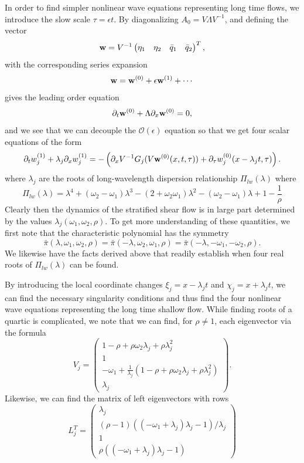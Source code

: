 \documentclass[a4paper,11pt]{article}
\newcommand{\bp}{\begin{pmatrix}}
\newcommand{\ep}{\end{pmatrix}}
\newcommand{\p}{\partial}
\begin{document}
In order to find simpler nonlinear wave equations representing long time flows, we introduce the slow scale $\tau = \epsilon t$.  By diagonalizing $A_{0} = V\Lambda V^{-1}$, and defining the vector 
\[
{\bf w} = V^{-1} \bp \eta_{1} & \eta_{2} & \bar{q}_{1} & \bar{q}_{2} \ep ^{T}, 
\] 
with the corresponding series expansion 
\[
{\bf w} = {\bf w}^{(0)} + \epsilon {\bf w}^{(1)} + \cdots 
\]
gives the leading order equation 
\[
\p_{t}{\bf w}^{(0)} +\Lambda \p_{x}{\bf w}^{(0)}  = 0,
\]
and we see that we can decouple the $\mathcal{O}(\epsilon)$ equation so that we get four scalar equations of the form 
\[
\p_{t} w^{(1)}_{j} + \lambda_{j}\p_{x}w^{(1)}_{j} =-\left( \p_{x}V^{-1}G_{j}(V{\bf w}^{(0)}(x,t,\tau))+\p_{\tau}w_{j}^{(0)}(x-\lambda_{j}t,\tau)\right).
\]
where $\lambda_{j}$ are the roots of long-wavelength dispersion relationship $\Pi_{lw}(\lambda)$ where 
\[
\Pi_{lw}(\lambda) = \lambda^{4} + (\omega_{2}-\omega_{1})\lambda^{3} -(2+ \omega_{2}\omega_{1})\lambda^{2} - \left( \omega_{2}-\omega_{1} \right) \lambda + 1- \frac{1}{\rho}
\]
Clearly then the dynamics of the stratified shear flow is in large part determined by the values $\lambda_{j}(\omega_{1},\omega_{2},\rho)$.  To get more understanding of these quantities, we first note that the characteristic polynomial has the symmetry  
\[
\bar{\pi}(\lambda,\omega_{1},\omega_{2},\rho) = \bar{\pi}(-\lambda,\omega_{2},\omega_{1},\rho) = \bar{\pi}(-\lambda,-\omega_{1},-\omega_{2},\rho). 
\]
We likewise have the facts derived above that readily establish when four real roots of $\Pi_{lw}(\lambda)$ can be found.  

By introducing the local coordinate changes $\xi_{j} = x - \lambda_{j}t$ and $\chi_{j} = x + \lambda_{j}t$, we can find the necessary singularity conditions and thus find the four nonlinear wave equations representing the long time shallow flow.  While finding roots of a quartic is complicated, we note that we can find, for $\rho \neq 1$, each eigenvector via the formula
\[
V_{j} = \bp 1-\rho + \rho\omega_{2}\lambda_{j} + \rho\lambda_{j}^{2} \\ 1 \\ -\omega_{1} + \frac{1}{\lambda_{j}}\left(1-\rho + \rho\omega_{2}\lambda_{j} + \rho\lambda_{j}^{2} \right) \\ \lambda_{j} \ep.
\]
Likewise, we can find the matrix of left eigenvectors with rows
\[
L_{j}^{T} = \bp \lambda_{j} \\ (\rho-1)((-\omega_{1}+\lambda_{j})\lambda_{j}-1)/\lambda_{j} \\ 1 \\ \rho((-\omega_{1}+\lambda_{j})\lambda_{j}-1) \ep
\]
\end{document}
